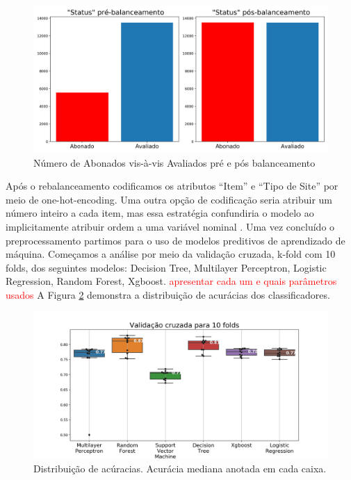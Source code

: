\documentclass[
	12pt,				%
	openany,			%
	oneside,			%
	a4paper,			%
	english,			%
	french,				%
	spanish,			%
	brazil,				%
	]{abntex2}
\begin{document}
\begin{figure}[h]
  \includegraphics[scale=0.5]{img/balanceamento.png}
  \caption{Número de Abonados vis-à-vis Avaliados pré e pós balanceamento}
  \label{ref:figbal}
\end{figure}

Após o rebalanceamento codificamos os atributos ``Item'' e ``Tipo de Site'' por
meio de one-hot-encoding. Uma outra opção de codificação seria atribuir um
número inteiro a cada item, mas essa estratégia confundiria o modelo ao
implicitamente atribuir ordem a uma variável nominal
\cite{faceli2011inteligencia}. Uma vez concluído o preprocessamento partimos
para o uso de modelos preditivos de aprendizado de máquina. Começamos a análise
por meio da validação cruzada, k-fold com 10 folds, dos seguintes modelos:
Decision Tree, Multilayer Perceptron, Logistic Regression, Random Forest,
Xgboost. \textcolor{red}{apresentar cada um e quais parâmetros usados} A Figura
\ref{ref:figaccs} demonstra a distribuição de acurácias dos classificadores.

\begin{figure}[H]
  \includegraphics[scale=0.5]{img/cvs.png}
  \caption{Distribuição de acúracias. Acurácia mediana anotada em cada caixa.}
  \label{ref:figaccs}
\end{figure}
\end{document}

